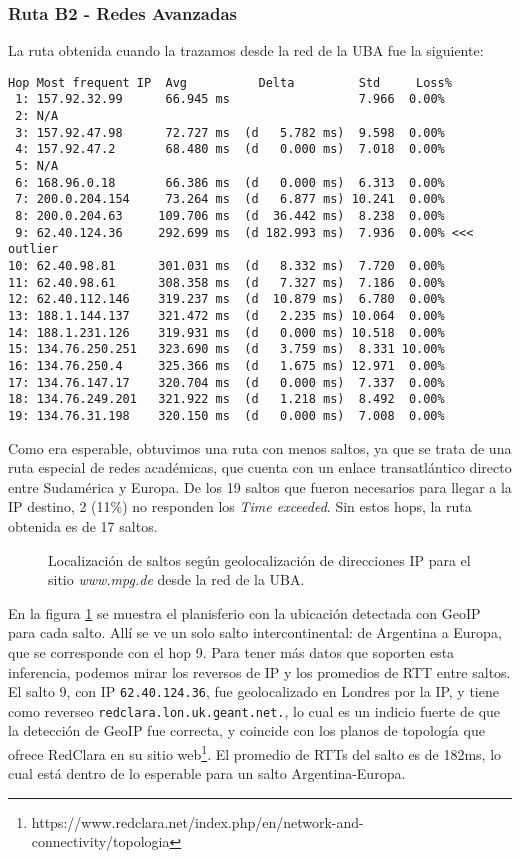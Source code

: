 \subsubsection{Ruta B2 - Redes Avanzadas}

La ruta obtenida cuando la trazamos desde la red de la UBA fue la siguiente:

\begin{Verbatim}[fontsize=\scriptsize]
Hop Most frequent IP  Avg          Delta         Std     Loss%
 1: 157.92.32.99      66.945 ms                  7.966  0.00% 
 2: N/A            
 3: 157.92.47.98      72.727 ms  (d   5.782 ms)  9.598  0.00% 
 4: 157.92.47.2       68.480 ms  (d   0.000 ms)  7.018  0.00% 
 5: N/A            
 6: 168.96.0.18       66.386 ms  (d   0.000 ms)  6.313  0.00% 
 7: 200.0.204.154     73.264 ms  (d   6.877 ms) 10.241  0.00% 
 8: 200.0.204.63     109.706 ms  (d  36.442 ms)  8.238  0.00% 
 9: 62.40.124.36     292.699 ms  (d 182.993 ms)  7.936  0.00% <<< outlier
10: 62.40.98.81      301.031 ms  (d   8.332 ms)  7.720  0.00% 
11: 62.40.98.61      308.358 ms  (d   7.327 ms)  7.186  0.00% 
12: 62.40.112.146    319.237 ms  (d  10.879 ms)  6.780  0.00% 
13: 188.1.144.137    321.472 ms  (d   2.235 ms) 10.064  0.00% 
14: 188.1.231.126    319.931 ms  (d   0.000 ms) 10.518  0.00% 
15: 134.76.250.251   323.690 ms  (d   3.759 ms)  8.331 10.00% 
16: 134.76.250.4     325.366 ms  (d   1.675 ms) 12.971  0.00% 
17: 134.76.147.17    320.704 ms  (d   0.000 ms)  7.337  0.00% 
18: 134.76.249.201   321.922 ms  (d   1.218 ms)  8.492  0.00% 
19: 134.76.31.198    320.150 ms  (d   0.000 ms)  7.008  0.00%
\end{Verbatim}

Como era esperable, obtuvimos una ruta con menos saltos, ya que se trata de una ruta especial de redes académicas, que cuenta con un enlace transatlántico directo entre Sudamérica y Europa.
De los 19 saltos que fueron necesarios para llegar a la IP destino, 2 (11\%) no responden los \emph{Time exceeded}. Sin estos hops, la ruta obtenida es de 17 saltos.

\begin{figure}[H]
    \caption{Localización de saltos según geolocalización de direcciones IP para
    el sitio \emph{www.mpg.de} desde la red de la UBA.}
    \label{res:escb2:map}
\end{figure}

En la figura \ref{res:escb2:map} se muestra el planisferio con la ubicación detectada con GeoIP para cada salto. Allí se ve un solo salto intercontinental: de Argentina a Europa, que se corresponde con el hop 9. Para tener más datos que soporten esta inferencia, podemos mirar los reversos de IP y los promedios de RTT entre saltos. El salto 9, con IP \texttt{62.40.124.36}, fue geolocalizado en Londres por la IP, y tiene como reverseo \texttt{redclara.lon.uk.geant.net.}, lo cual es un indicio fuerte de que la detección de GeoIP fue correcta, y coincide con los planos de topología que ofrece RedClara en su sitio web\footnote{https://www.redclara.net/index.php/en/network-and-connectivity/topologia}. El promedio de RTTs del salto es de 182ms, lo cual está dentro de lo esperable para un salto Argentina-Europa.

